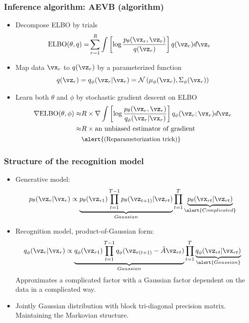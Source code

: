 \documentclass[16pt,presentation]{beamer}
\begin{document}
\begin{frame}
\frametitle{Inference algorithm: AEVB (algorithm)}
\begin{itemize}
\item Decompose ELBO by trials
\[\begin{split}
\text{ELBO}(\theta, q) %
=& \sum_{r=1}^{R} \int \left[\log \frac{p_{\theta}(\vx_r, \vz_r)}{q(\vz_r)}\right] q(\vz_r) d\vz_r 
\end{split}\]
\item Map data $\vx_r$ to $q(\vz_r)$ by a parameterized function
\[q(\vz_r) = q_\phi(\vz_r | \vx_r) = \N\left(\mu_\phi(\vx_r), \Sigma_\phi(\vx_r)\right)\]
\item Learn both $\theta$ and $\phi$ by \alert{stochastic} gradient descent on ELBO
\[\begin{split}
\grad\text{ELBO}(\theta, \phi) \approx& R \times \grad \int \left[\log \frac{p_{\theta}(\vx_r, \vz_r)}{q_\phi(\vz_r | \vx_r)}\right] q_\phi(\vz_r; \vx_r) d\vz_r\\
\approx& R \times \text{an unbiased estimator of gradient} \\
&\text{{\small \alert{(Reparameterization trick)}}}
\end{split}\]
\end{itemize}
\end{frame}

\begin{frame}
\frametitle{Structure of the recognition model}
\begin{itemize}
\item Generative model:
\[p_\theta(\vz_r | \vx_r) \propto \underbrace{p_\theta(\vz_{r1})
\prod_{t=1}^{T-1}p_\theta(\vz_{t+1)} | \vz_{rt})}_{Gaussian} 
\prod_{t=1}^T \underbrace{p_\theta(\vx_{rt} | \vz_{rt})}_{\alert{Complicated}}
\]
\item Recognition model, product-of-Gaussian form:
\[q_\phi(\vz_r | \vx_r) \propto \underbrace{q_\phi(\vz_{r1}) 
\prod_{t=1}^{T-1}q_\phi(\vz_{r(t+1)} - \tilde{A}\vz_{rt}) }_{Gaussian}
\prod_{t=1}^T \underbrace{q_\phi(\vz_{rt} | \vx_{rt})}_{\alert{Gaussian}}
\]
Approximates a complicated factor with a Gaussian factor dependent on the data in a complicated way.
\item Jointly Gaussian distribution with block tri-diagonal precision matrix. Maintaining the Markovian structure.
\end{itemize}
\end{frame}
\end{document}
